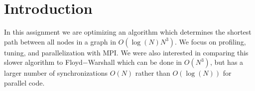 \section{Introduction}\label{sec:intro}
In this assignment we are optimizing an algorithm which determines the shortest
path between all nodes in a graph in $O(\log(N)N^3)$. We focus on profiling,
tuning, and parallelization with MPI. We were also interested in comparing this
slower algorithm to Floyd$-$Warshall which can be done in $O(N^3)$, but has a
larger number of synchronizations $O(N)$ rather than $O(\log(N))$ for parallel
code.
